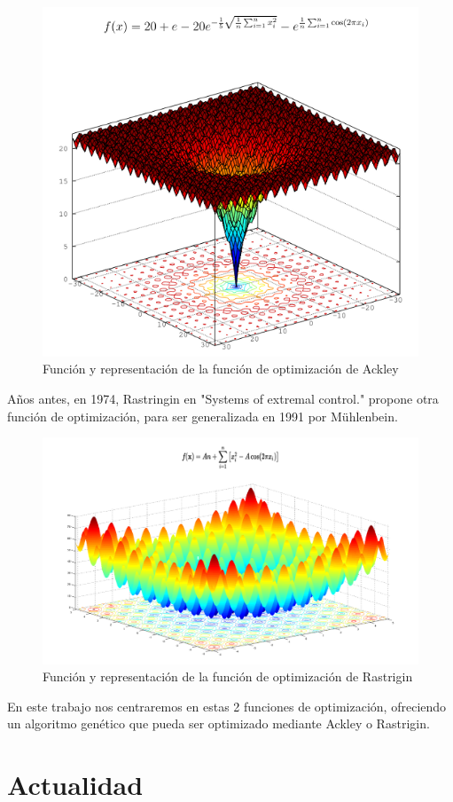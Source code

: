 \bigskip
\begin{figure}[h]
	\centering
	\includegraphics[width=0.7\linewidth]{../images/ackley}
	\caption[Función y representación de la función de optimización de Ackley]{Función y representación de la función de optimización de Ackley}
	\label{fig:ackley}
\end{figure}


\bigskip
Años antes, en 1974, Rastringin en "Systems of extremal control." propone otra función de optimización, para ser generalizada en 1991 por Mühlenbein.


\bigskip
\begin{figure}[h]
	\centering
	\includegraphics[width=0.7\linewidth]{../images/rastrigin}
	\caption[Función y representación de la función de optimización de Rastrigin]{Función y representación de la función de optimización de Rastrigin}
	\label{fig:rastrigin}
\end{figure}

\bigskip
En este trabajo nos centraremos en estas 2 funciones de optimización, ofreciendo un algoritmo genético que pueda ser optimizado mediante Ackley o Rastrigin.


\newpage
\section{Actualidad}
\bigskip

